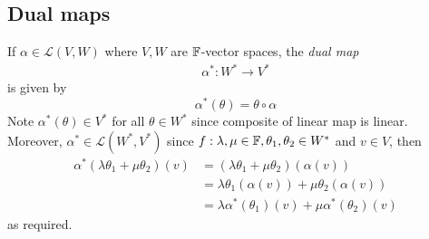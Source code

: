 \documentclass[a4paper]{article}
\begin{document}
\subsection{Dual maps}
\begin{defi}
If $\alpha\in\mathcal{L}\left(V,W\right)$ where $V,W$ are $\mathbb{F}$-vector spaces, the \emph{dual map}
\begin{equation*}
\begin{aligned}
\alpha^*: W^* \to V^*
\end{aligned}
\end{equation*}
is given by $$\alpha^* \left(\theta\right) = \theta \circ \alpha$$
Note $\alpha^*\left(\theta\right) \in V^*$ for all $\theta \in W^*$ since composite of linear map is linear.\\
Moreover, $\alpha^* \in \mathcal{L}\left(W^*,V^*\right)$ since $f:\lambda,\mu \in \mathbb{F},\theta_1,\theta_2 \in W^*$ and $v \in V$, then
\begin{equation*}
\begin{aligned}
\alpha^*\left(\lambda\theta_1+\mu\theta_2\right)\left(v\right) &= \left(\lambda\theta_1+\mu\theta_2\right)\left(\alpha\left(v\right)\right)\\
&= \lambda \theta_1 \left(\alpha\left(v\right)\right) + \mu \theta_2\left(\alpha\left(v\right)\right)\\
&= \lambda\alpha^* \left(\theta_1\right)\left(v\right) + \mu \alpha^* \left(\theta_2\right)\left(v\right)
\end{aligned}
\end{equation*}
as required.
\end{defi}
\end{document}
